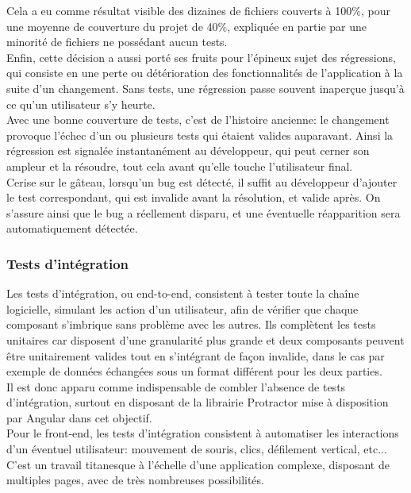 \documentclass[a4paper,french,12pt]{article}
\begin{document}
	Cela a eu comme résultat visible des dizaines de fichiers couverts à 100\%, pour une moyenne de couverture du projet de 40\%, expliquée en partie par une minorité de fichiers ne possédant aucun tests.~\\	
	
	Enfin, cette décision a aussi porté ses fruits pour l'épineux sujet des régressions, qui consiste en une perte ou détérioration des fonctionnalités de l'application à la suite d'un changement. Sans tests, une régression passe souvent inaperçue jusqu'à ce qu'un utilisateur s'y heurte.~\\	
	
	Avec une bonne couverture de tests, c'est de l'histoire ancienne: le changement provoque l'échec d'un ou plusieurs tests qui étaient valides auparavant. Ainsi la régression est signalée instantanément au développeur, qui peut cerner son ampleur et la résoudre, tout cela avant qu'elle touche l'utilisateur final.~\\	
	
	Cerise sur le gâteau, lorsqu'un bug est détecté, il suffit au développeur d'ajouter le test correspondant, qui est invalide avant la résolution, et valide après. On s'assure ainsi que le bug a réellement disparu, et une éventuelle réapparition sera automatiquement détectée.
	
	\subsubsection{Tests d'intégration}
	Les tests d'intégration, ou end-to-end, consistent à tester toute la chaîne logicielle, simulant les action d'un utilisateur, afin de vérifier que chaque composant s'imbrique sans problème avec les autres. Ils complètent les tests unitaires car disposent d'une granularité plus grande et deux composants peuvent être unitairement valides tout en s'intégrant de façon invalide, dans le cas par exemple de données échangées sous un format différent pour les deux parties.~\\	
	
	Il est donc apparu comme indispensable de combler l'absence de tests d'intégration, surtout en disposant de la librairie Protractor mise à disposition par Angular dans cet objectif.~\\	
	
	Pour le front-end, les tests d'intégration consistent à automatiser les interactions d'un éventuel utilisateur: mouvement de souris, clics, défilement vertical, etc... C'est un travail titanesque à l'échelle d'une application complexe, disposant de multiples pages, avec de très nombreuses possibilités.~\\	
	
\end{document}
